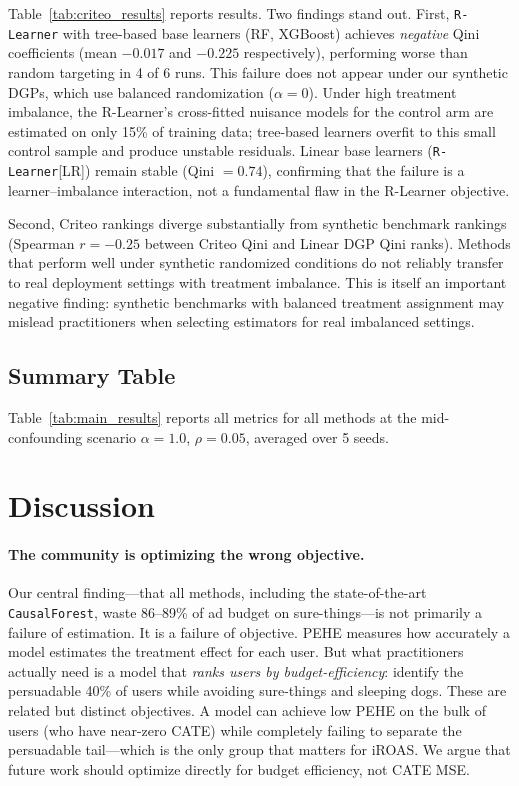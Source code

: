 \documentclass[10pt]{article}
\newcommand{\rlearner}{\texttt{R-Learner}\xspace}
\newcommand{\causalforest}{\texttt{CausalForest}\xspace}
\begin{document}
Table~\ref{tab:criteo_results} reports results. Two findings stand out. First,
\rlearner with tree-based base learners (RF, XGBoost) achieves \emph{negative}
Qini coefficients (mean $-0.017$ and $-0.225$ respectively), performing
worse than random targeting in 4 of 6 runs. This failure does not appear under
our synthetic DGPs, which use balanced randomization ($\alpha=0$). Under
high treatment imbalance, the R-Learner's cross-fitted nuisance models for the
control arm are estimated on only 15\% of training data; tree-based learners
overfit to this small control sample and produce unstable residuals. Linear
base learners (\rlearner[LR]) remain stable (Qini $=0.74$), confirming that
the failure is a learner--imbalance interaction, not a fundamental flaw in the
R-Learner objective.

Second, Criteo rankings diverge substantially from synthetic benchmark rankings
(Spearman $r=-0.25$ between Criteo Qini and Linear DGP Qini ranks). Methods
that perform well under synthetic randomized conditions do not reliably
transfer to real deployment settings with treatment imbalance. This is itself
an important negative finding: synthetic benchmarks with balanced treatment
assignment may mislead practitioners when selecting estimators for real
imbalanced settings.



\subsection{Summary Table}

Table~\ref{tab:main_results} reports all metrics for all methods at the
mid-confounding scenario $\alpha=1.0$, $\rho=0.05$, averaged over 5 seeds.



\section{Discussion}
\label{sec:discussion}

\paragraph{The community is optimizing the wrong objective.}
Our central finding---that all methods, including the state-of-the-art
\causalforest, waste 86--89\% of ad budget on sure-things---is not primarily
a failure of estimation. It is a failure of objective. PEHE measures how
accurately a model estimates the treatment effect for each user. But what
practitioners actually need is a model that \emph{ranks users by
budget-efficiency}: identify the persuadable 40\% of users while avoiding
sure-things and sleeping dogs. These are related but distinct objectives.
A model can achieve low PEHE on the bulk of users (who have near-zero CATE)
while completely failing to separate the persuadable tail---which is the
only group that matters for iROAS. We argue that future work should optimize
directly for budget efficiency, not CATE MSE.
\end{document}
